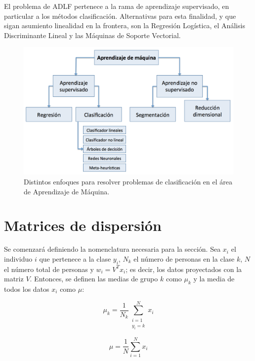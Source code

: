 El problema de ADLF pertenece a la rama de aprendizaje supervisado, en particular a los métodos clasificación. Alternativas para esta finalidad, y que sigan asumiento linealidad en la frontera, son la Regresión Logística, el Análisis Discriminante Lineal y las Máquinas de Soporte Vectorial. 

\begin{figure}[!ht]
  \centering
  \includegraphics[width=1\textwidth]{Figures/Chapter1_Clasificacion1.png} 
  \caption[Enfoques para resolver problemas de clasificación.]
  {Distintos enfoques para resolver problemas de clasificación en el área de Aprendizaje de Máquina.}
\end{figure}

\section{Matrices de dispersión}
Se comenzará definiendo la nomenclatura necesaria para la sección. Sea $x_i$ el individuo $i$ que pertenece a la clase $y_i$, $N_{k}$ el número de personas en la clase $k$, $N$ el número total de personas y $w_i = V^T x_i$; es decir, los datos proyectados con la matriz $V$. Entonces, se definen las medias de grupo $k$ como $\mu_k$ y la media de todos los datos $x_i$ como $\mu$:

\begin{equation} \label{eq:18}
  \mu_k = \frac{1}{N_{k}} 
  \sum_{\substack{i = 1\\
                    y_i = k}}^{N}
                  x_i
\end{equation} 

\begin{equation} \label{eq:19}
 \mu = \frac{1}{N} \sum_{i = 1}^{N} x_i
\end{equation}

